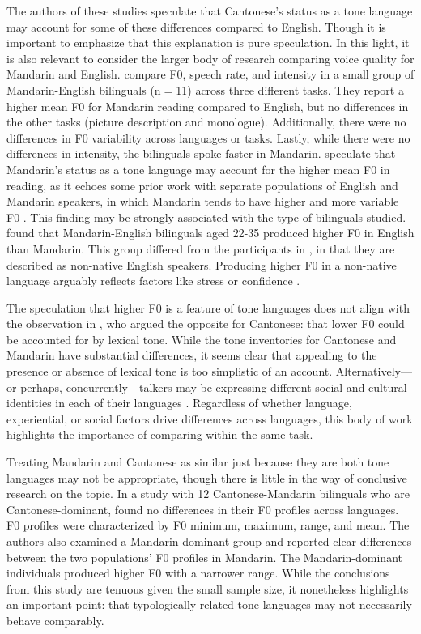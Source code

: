 The authors of these studies speculate that Cantonese's status as a tone language may account for some of these differences compared to English. Though it is important to emphasize that this explanation is pure speculation. In this light, it is also relevant to consider the larger body of research comparing voice quality for Mandarin and English. \citet{lee_2017_bilingual} compare F0, speech rate, and intensity in a small group of Mandarin-English bilinguals (n$=$11) across three different tasks. They report a higher mean F0 for Mandarin reading compared to English, but no differences in the other tasks (picture description and monologue). Additionally, there were no differences in F0 variability across languages or tasks. Lastly, while there were no differences in intensity, the bilinguals spoke faster in Mandarin. \citet{lee_2017_bilingual} speculate that Mandarin's status as a tone language may account for the higher mean F0 in reading, as it echoes some prior work with separate populations of English and Mandarin speakers, in which Mandarin tends to have higher and more variable F0 \citep{keating_2012_f0}. This finding may be strongly associated with the type of bilinguals studied. \citet{xue_2002_f0} found that Mandarin-English bilinguals aged 22-35 produced higher F0 in English than Mandarin. This group differed from the participants in \citet{lee_2017_bilingual}, in that they are described as non-native English speakers. Producing higher F0 in a non-native language arguably reflects factors like stress or confidence \citep{jarvinen_2013_speaking, lee_2017_bilingual}.

The speculation that higher F0 is a feature of tone languages does not align with the observation in \citet{ng_2012_ltas}, who argued the opposite for Cantonese: that lower F0 could be accounted for by lexical tone. While the tone inventories for Cantonese and Mandarin have substantial differences, it seems clear that appealing to the presence or absence of lexical tone is too simplistic of an account. Alternatively---or perhaps, concurrently---talkers may be expressing different social and cultural identities in each of their languages \citep{loveday_1981_pitch, voigt_2016_between}. Regardless of whether language, experiential, or social factors drive differences across languages, this body of work highlights the importance of comparing within the same task.

Treating Mandarin and Cantonese as similar just because they are both tone languages may not be appropriate, though there is little in the way of conclusive research on the topic. In a study with 12 Cantonese-Mandarin bilinguals who are Cantonese-dominant, \citet{yang_2020_f0} found no differences in their F0 profiles across languages. F0 profiles were characterized by F0 minimum, maximum, range, and mean. The authors also examined a Mandarin-dominant group and reported clear differences between the two populations' F0 profiles in Mandarin. The Mandarin-dominant individuals produced higher F0 with a narrower range. While the conclusions from this study are tenuous given the small sample size, it nonetheless highlights an important point: that typologically related tone languages may not necessarily behave comparably.


